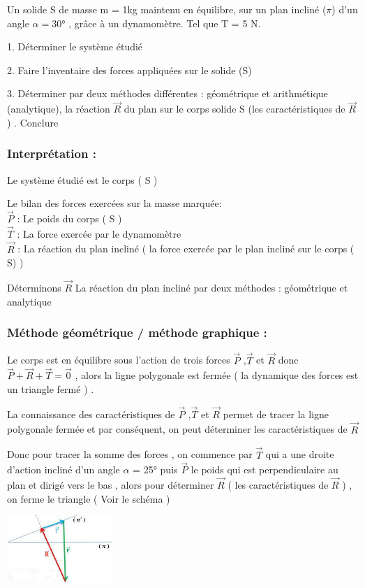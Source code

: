 \documentclass[12pt]{article}
\begin{document}
 Un solide S de masse m = 1kg maintenu en équilibre, sur un plan incliné ($\pi$) d’un angle $\alpha = $30° , grâce à un dynamomètre. Tel que T = 5 N.
 
 1. Déterminer le système étudié
 
 2. Faire l’inventaire des forces appliquées sur le solide (S)

 3. Déterminer par deux méthodes différentes : géométrique et
arithmétique (analytique), la réaction $\vec{R}$ du plan sur le corps solide S
(les caractéristiques de $\vec{R}$ ) . Conclure
\subsubsection{Interprétation : }

Le système étudié est le corps ( S )

Le bilan des forces exercées sur la masse marquée:
\\$\vec{P}$ : Le poids du corps ( S )
\\$\vec{T}$ : La force exercée par le dynamomètre
\\$\vec{R}$ : La réaction du plan incliné ( la force exercée par le plan incliné sur le corps ( S) )

Déterminons $\vec{R}$ La réaction du plan incliné par deux méthodes : géométrique et analytique

\subsubsection{Méthode géométrique / méthode graphique : }
Le corps est en équilibre sous l’action de trois forces $\vec{P}$ ,$\vec{T}$ et $\vec{R}$ donc $\vec{P} + \vec{R} + \vec{T} = \vec{0}$ ,
 alors la ligne polygonale est fermée ( la dynamique des forces est un triangle fermé ) .

La connaissance des caractéristiques de $\vec{P}$ ,$\vec{T}$ et $\vec{R}$  permet de tracer la ligne polygonale fermée et par
conséquent, on peut déterminer les caractéristiques de $\vec{R}$

Donc pour tracer la somme des forces , on commence par $\vec{T}$ qui a une droite d’action incliné d’un angle
$\alpha$ = 25° puis $\vec{P}$ le poids qui est perpendiculaire au plan  et dirigé vers le bas , alors pour déterminer $\vec{R}$
( les caractéristiques de $\vec{R}$ ) , on ferme le triangle ( Voir le schéma )
 
\begin{center}
\includegraphics[width=0.3\textwidth]{./img/img04.png}
\end{center}
\end{document}
